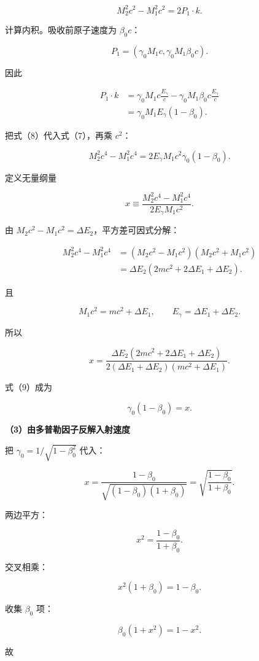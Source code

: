 \documentclass[12pt,a4paper,UTF8]{ctexart}
\begin{document}
\[
M_2^2c^2-M_1^2c^2=2P_1\cdot k.
\tag{7}
\]

计算内积。吸收前原子速度为 \(\beta_0c\)：

\[
P_1=\left(\gamma_0M_1c,\gamma_0M_1\beta_0c\right).
\]

因此

\[
\begin{aligned}
P_1\cdot k
&=\gamma_0M_1c\frac{E_\gamma}{c}
-\gamma_0M_1\beta_0c\frac{E_\gamma}{c}\\
&=\gamma_0M_1E_\gamma(1-\beta_0).
\end{aligned}
\tag{8}
\]

把式（8）代入式（7），再乘 \(c^2\)：

\[
M_2^2c^4-M_1^2c^4
=2E_\gamma M_1c^2\gamma_0(1-\beta_0).
\tag{9}
\]

定义无量纲量

\[
x\equiv
\frac{M_2^2c^4-M_1^2c^4}
{2E_\gamma M_1c^2}.
\tag{10}
\]

由 \(M_2c^2-M_1c^2=\Delta E_2\)，平方差可因式分解：

\[
\begin{aligned}
M_2^2c^4-M_1^2c^4
&=(M_2c^2-M_1c^2)(M_2c^2+M_1c^2)\\
&=\Delta E_2
\left(2mc^2+2\Delta E_1+\Delta E_2\right).
\end{aligned}
\tag{11}
\]

且

\[
M_1c^2=mc^2+\Delta E_1,
\qquad
E_\gamma=\Delta E_1+\Delta E_2.
\]

所以

\[
\boxed{
x=
\frac{\Delta E_2(2mc^2+2\Delta E_1+\Delta E_2)}
{2(\Delta E_1+\Delta E_2)(mc^2+\Delta E_1)}
}.
\tag{12}
\]

式（9）成为

\[
\gamma_0(1-\beta_0)=x.
\tag{13}
\]

\textbf{（3）由多普勒因子反解入射速度}

把 \(\gamma_0=1/\sqrt{1-\beta_0^2}\) 代入：

\[
x
=\frac{1-\beta_0}{\sqrt{(1-\beta_0)(1+\beta_0)}}
=\sqrt{\frac{1-\beta_0}{1+\beta_0}}.
\tag{14}
\]

两边平方：

\[
x^2=\frac{1-\beta_0}{1+\beta_0}.
\]

交叉相乘：

\[
x^2(1+\beta_0)=1-\beta_0.
\]

收集 \(\beta_0\) 项：

\[
\beta_0(1+x^2)=1-x^2.
\]

故
\end{document}
